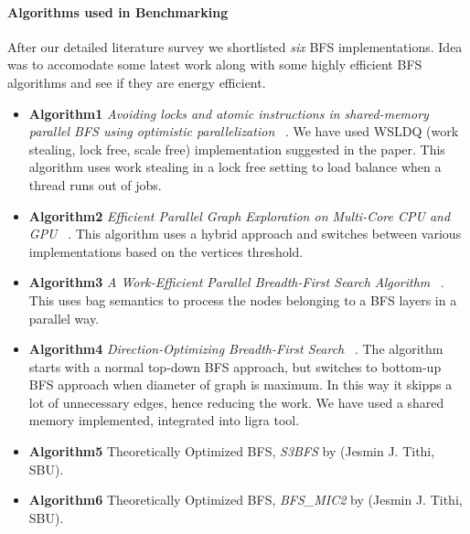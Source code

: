 \paragraph{Algorithms used in Benchmarking}
After our detailed literature survey we shortlisted \emph{six} BFS
implementations.  Idea was to accomodate some latest work along with some
highly efficient BFS algorithms and see if they are energy efficient.
\begin{itemize}[leftmargin=*]
\item \textbf{Algorithm1}
\emph{Avoiding locks and atomic instructions in shared-memory parallel
BFS using optimistic parallelization} ~\cite{WSLDQ-BFS}.  We have used
WSLDQ (work stealing, lock free, scale free) implementation suggested
in the paper.  This algorithm uses work stealing in a lock free
setting to load balance when a thread runs out of jobs.
\item \textbf{Algorithm2}
\emph{Efficient Parallel Graph Exploration on Multi-Core CPU and GPU}
~\cite{STANFORD-BFS}. This algorithm uses a hybrid approach and
switches between various implementations based on the vertices
threshold.
\item \textbf{Algorithm3}
\emph{A Work-Efficient Parallel Breadth-First Search Algorithm}
~\cite{MIT-BFS}.  This uses bag semantics to process the nodes
belonging to a BFS layers in a parallel way.
\item \textbf{Algorithm4}
\emph{Direction-Optimizing Breadth-First Search} ~\cite{LIGRA-BFS}.
The algorithm starts with a normal top-down BFS approach, but switches to
bottom-up BFS approach when diameter of graph is maximum.  In this way
it skipps a lot of unnecessary edges, hence reducing the work.
We have used a shared memory implemented, integrated into ligra tool.
\item \textbf{Algorithm5}
Theoretically Optimized BFS, \emph{S3BFS} by (Jesmin J. Tithi, SBU).
\item \textbf{Algorithm6}
Theoretically Optimized BFS, \emph{BFS\_MIC2} by (Jesmin J. Tithi, SBU).
\end{itemize}

